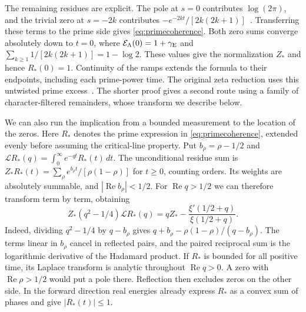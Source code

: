 \documentclass[11pt,letterpaper]{article}
\numberwithin{equation}{section}
\begin{document}
The remaining residues are explicit. The pole at $s=0$ contributes $\log(2\pi)$, and the trivial zero at $s=-2k$ contributes $-e^{-2kt}/[2k(2k+1)]$~\cite[\S I.1, Eqs.~(I.2)--(I.4)]{primeguide}. Transferring these terms to the prime side gives \eqref{eq:primecoherence}. Both zero sums converge absolutely down to $t=0$, where $\mathcal E_\Lambda(0)=1+\gamma_{\rm E}$ and $\sum_{k\ge1}1/[2k(2k+1)]=1-\log 2$. These values give the normalization $Z_*$ and hence $R_*(0)=1$. Continuity of the ramps extends the formula to their endpoints, including each prime-power time. The original zeta reduction uses this untwisted prime excess~\cite{primeinput,primeguide}. The shorter proof gives a second route using a family of character-filtered remainders, whose transform we describe below.

We can also run the implication from a bounded measurement to the location of the zeros. Here $R_*$ denotes the prime expression in \eqref{eq:primecoherence}, extended evenly before assuming the critical-line property. Put $b_\rho=\rho-1/2$ and $\mathcal L R_*(q)=\int_0^\infty e^{-qt}R_*(t)\,dt$. The unconditional residue sum is $Z_*R_*(t)=\sum_\rho e^{b_\rho t}/[\rho(1-\rho)]$ for $t\ge0$, counting orders. Its weights are absolutely summable, and $|\operatorname{Re}b_\rho|<1/2$. For $\operatorname{Re}q>1/2$ we can therefore transform term by term, obtaining
\[
 Z_*(q^2-1/4)\mathcal L R_*(q)
     =q Z_*-\frac{\xi'(1/2+q)}{\xi(1/2+q)} .
\]
Indeed, dividing $q^2-1/4$ by $q-b_\rho$ gives $q+b_\rho-\rho(1-\rho)/(q-b_\rho)$. The terms linear in $b_\rho$ cancel in reflected pairs, and the paired reciprocal sum is the logarithmic derivative of the Hadamard product. If $R_*$ is bounded for all positive time, its Laplace transform is analytic throughout $\operatorname{Re}q>0$. A zero with $\operatorname{Re}\rho>1/2$ would put a pole there. Reflection then excludes zeros on the other side. In the forward direction real energies already express $R_*$ as a convex sum of phases and give $|R_*(t)|\le1$.
\end{document}
